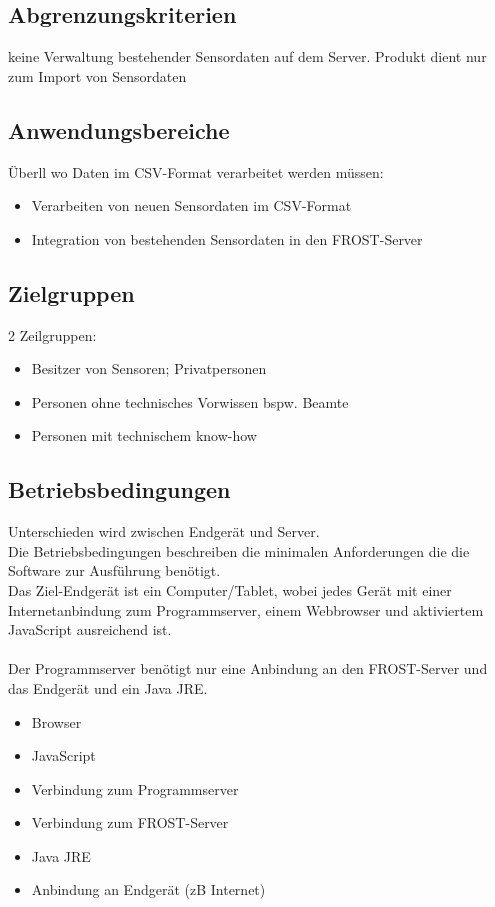 \documentclass[12 pt]{article}
\begin{document}
\subsection{Abgrenzungskriterien}
keine Verwaltung bestehender Sensordaten auf dem Server. Produkt dient nur zum Import von Sensordaten

\subsection{Anwendungsbereiche}
Überll wo Daten im CSV-Format verarbeitet werden müssen: \\
\begin{itemize}
\item Verarbeiten von neuen Sensordaten im CSV-Format
\item Integration von bestehenden Sensordaten in den FROST-Server
\end{itemize}

\subsection{Zielgruppen}
2 Zeilgruppen:
\begin{itemize}
\item Besitzer von Sensoren; Privatpersonen
\item Personen ohne technisches Vorwissen bspw. Beamte
\item Personen mit technischem know-how
\end{itemize}

\subsection{Betriebsbedingungen}
Unterschieden wird zwischen Endgerät und Server. \\
Die Betriebsbedingungen beschreiben die minimalen Anforderungen die die Software zur Ausführung benötigt. \\
Das Ziel-Endgerät ist ein Computer/Tablet, wobei jedes Gerät mit einer Internetanbindung zum Programmserver, einem Webbrowser und aktiviertem JavaScript ausreichend ist.\\
\ \\
Der Programmserver benötigt nur eine Anbindung an den FROST-Server und das Endgerät und ein Java JRE.
\begin{itemize}
	\item Browser
	\item JavaScript
	\item Verbindung zum Programmserver
\end{itemize}
\begin{itemize}
	\item Verbindung zum FROST-Server
	\item Java JRE
	\item Anbindung an Endgerät (zB Internet)
\end{itemize}
\end{document}
